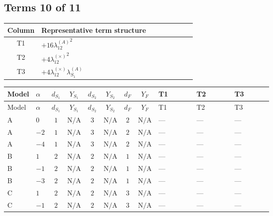 \documentclass[8pt]{article}
\begin{document}
\begin{landscape}
\subsection*{Terms 10 of 11}
\begin{center}
\begin{tabular}{@{}c >{\raggedright\arraybackslash}p{0.82\linewidth}@{}}
\toprule
Column & Representative term structure \\
\midrule
T1 & \(\displaystyle +16 {\lambda_{12}^{(A)}}^2\) \\
\midrule
T2 & \(\displaystyle +4 {\lambda_{12}^{(\times)}}^2\) \\
\midrule
T3 & \(\displaystyle +4 {\lambda_{12}^{(\times)}} {\lambda_{S_1}^{(A)}}\) \\
\midrule
\bottomrule
\end{tabular}
\end{center}
\smallskip
\tiny
\begin{longtable}{@{}llcccccc >{\raggedright\arraybackslash}p{0.21\linewidth} >{\raggedright\arraybackslash}p{0.21\linewidth} >{\raggedright\arraybackslash}p{0.21\linewidth}@{}}
\toprule
Model & $\alpha$ & $d_{S_1}$ & $Y_{S_1}$ & $d_{S_2}$ & $Y_{S_2}$ & $d_F$ & $Y_F$ & T1 & T2 & T3 \\
\midrule
\endfirsthead
\toprule
Model & $\alpha$ & $d_{S_1}$ & $Y_{S_1}$ & $d_{S_2}$ & $Y_{S_2}$ & $d_F$ & $Y_F$ & T1 & T2 & T3 \\
\midrule
\endhead
A & $0$ & $1$ & $\text{N/A}$ & $3$ & $\text{N/A}$ & $2$ & $\text{N/A}$ & --- & --- & --- \\
\midrule
A & $-2$ & $1$ & $\text{N/A}$ & $3$ & $\text{N/A}$ & $2$ & $\text{N/A}$ & --- & --- & --- \\
\midrule
A & $-4$ & $1$ & $\text{N/A}$ & $3$ & $\text{N/A}$ & $2$ & $\text{N/A}$ & --- & --- & --- \\
\midrule
B & $1$ & $2$ & $\text{N/A}$ & $2$ & $\text{N/A}$ & $1$ & $\text{N/A}$ & --- & --- & --- \\
\midrule
B & $-1$ & $2$ & $\text{N/A}$ & $2$ & $\text{N/A}$ & $1$ & $\text{N/A}$ & --- & --- & --- \\
\midrule
B & $-3$ & $2$ & $\text{N/A}$ & $2$ & $\text{N/A}$ & $1$ & $\text{N/A}$ & --- & --- & --- \\
\midrule
C & $1$ & $2$ & $\text{N/A}$ & $2$ & $\text{N/A}$ & $3$ & $\text{N/A}$ & --- & --- & --- \\
\midrule
C & $-1$ & $2$ & $\text{N/A}$ & $2$ & $\text{N/A}$ & $3$ & $\text{N/A}$ & --- & --- & --- \\

\end{longtable}
\end{landscape}
\end{document}
